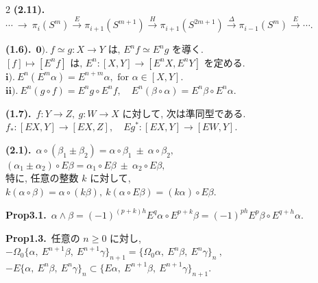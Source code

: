 \documentclass[10pt, leqno]{ltjsarticle}
\newcommand{\Ex}{E}        %
\numberwithin{equation}{section}
\theoremstyle{plain}
\theoremstyle{definition}
\theoremstyle{remark}
\begin{document}
\begin{paracol}{2}
\noindent
\textbf{(2.11).}\
\(\cdots\ \longrightarrow\ 
\pi_i(S^m)\xrightarrow{\,E\,}\pi_{i+1}(S^{m+1})\xrightarrow{\,H\,}
\pi_{i+1}(S^{2m+1})\xrightarrow{\,\Delta\,}\pi_{i-1}(S^m)\xrightarrow{\,E\,}\cdots.\)

\noindent
\textbf{(1.6).}\
\(\textbf{0).}\ 
f\simeq g:X\to Y \text{ は, }
E^n f\simeq E^n g \text{ を導く.}\)\\
\([f]\mapsto [E^n f] \text{ は, } 
E^n : [X,Y] \to [E^n X, E^n Y] \text{ を定める.}\)\\
\(\textbf{i).}\ 
E^n(E^m\alpha) = E^{n+m}\alpha,
\text{ for } \alpha\in [X,Y].\)\\
\(\textbf{ii).}\
E^n(g\circ f) = E^n g\circ E^n f,\quad
E^n(\beta\circ\alpha) = E^n\beta\circ E^n\alpha.\)

\noindent
\textbf{(1.7).}\
\(f:Y\to Z,\ g:W\to X \text{ に対して, 次は準同型である.}\)\\
\(
f_*:[EX, Y] \to [EX,Z],\quad Eg^*:[EX,Y]\to[EW,Y].
\)

\noindent
\textbf{(2.1).}\
\(\alpha\circ(\beta_1\pm\beta_2) =\alpha\circ\beta_1\ \pm\ \alpha\circ\beta_2,\)\\
\((\alpha_1\pm\alpha_2)\circ E\beta =\alpha_1\circ E\beta\ \pm\ \alpha_2\circ E\beta,\)\\
特に, 任意の整数 $k$ に対して,\\
\(
k(\alpha\circ\beta)=\alpha\circ(k\beta),\
k(\alpha\circ E\beta)=(k\alpha)\circ E\beta.
\)

\noindent
\textbf{Prop3.1.}\
\(
\alpha \wedge \beta
= (-1)^{(p+k)h} E^{q}\alpha \circ E^{p+k}\beta
= (-1)^{ph} E^{p}\beta \circ E^{q+h}\alpha .
\)

\noindent
\textbf{Prop1.3.}\
任意の $n\ge 0$ に対し,\\
\(
-\Omega_0\bigl\{\alpha,\ \Ex^{n+1}\beta,\ \Ex^{n+1}\gamma\bigr\}_{n+1}
=
\bigl\{\Omega_0\alpha,\ \Ex^{n}\beta,\ \Ex^{n}\gamma\bigr\}_n \ ,
\)\\
\(
-\Ex\{\alpha,\ \Ex^n\beta,\ \Ex^n\gamma\}_n
\subset
\bigl\{E\alpha,\ \Ex^{n+1}\beta,\ \Ex^{n+1}\gamma\bigr\}_{n+1}.
\)





\end{paracol}
\end{document}
